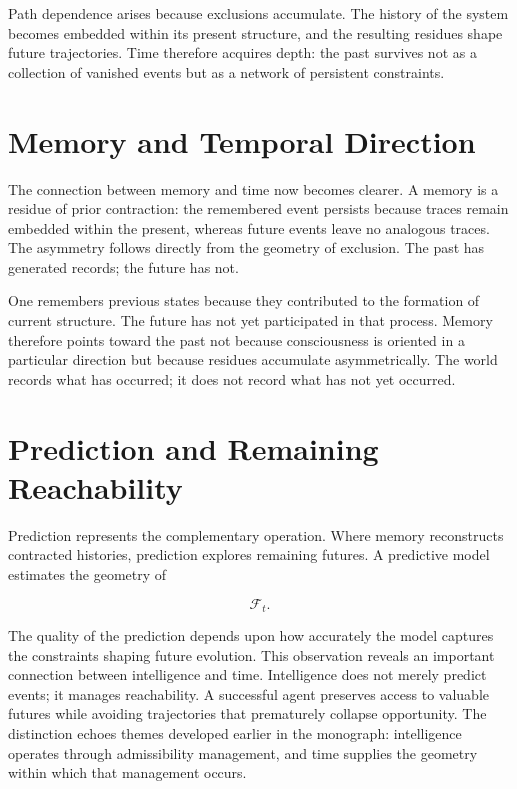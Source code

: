 \documentclass[11pt,oneside]{book}
\theoremstyle{plain}
\theoremstyle{definition}
\theoremstyle{remark}
\begin{document}
Path dependence arises because exclusions accumulate. The history of the system becomes embedded within its present structure, and the resulting residues shape future trajectories. Time therefore acquires depth: the past survives not as a collection of vanished events but as a network of persistent constraints.

\section{Memory and Temporal Direction}

The connection between memory and time now becomes clearer. A memory is a residue of prior contraction: the remembered event persists because traces remain embedded within the present, whereas future events leave no analogous traces. The asymmetry follows directly from the geometry of exclusion. The past has generated records; the future has not.

One remembers previous states because they contributed to the formation of current structure. The future has not yet participated in that process. Memory therefore points toward the past not because consciousness is oriented in a particular direction but because residues accumulate asymmetrically. The world records what has occurred; it does not record what has not yet occurred.

\section{Prediction and Remaining Reachability}

Prediction represents the complementary operation. Where memory reconstructs contracted histories, prediction explores remaining futures. A predictive model estimates the geometry of

\begin{equation}
\mathcal{F}_t.
\end{equation}

The quality of the prediction depends upon how accurately the model captures the constraints shaping future evolution. This observation reveals an important connection between intelligence and time. Intelligence does not merely predict events; it manages reachability. A successful agent preserves access to valuable futures while avoiding trajectories that prematurely collapse opportunity. The distinction echoes themes developed earlier in the monograph: intelligence operates through admissibility management, and time supplies the geometry within which that management occurs.
\end{document}
